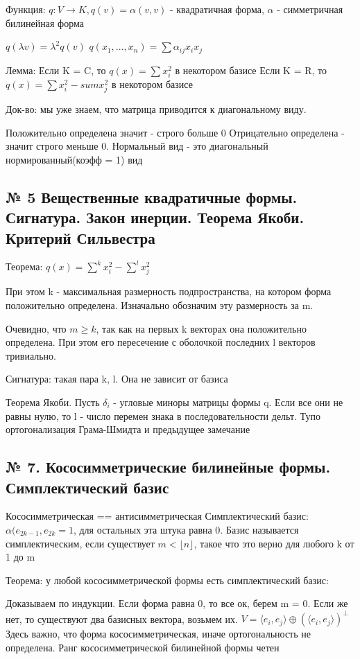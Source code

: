 \documentclass{article}
\begin{document}
Функция: $q : V \rightarrow K, q(v) = \alpha(v, v)$ - квадратичная форма, $\alpha$ - симметричная билинейная форма

$q(\lambda v) = \lambda^2q(v)$
$q(x_1, ..., x_n) = \sum{\alpha_{ij}x_ix_j}$

Лемма:
Если K = C, то $q(x) = \sum{x_i^2}$ в некотором базисе
Если K = R, то $q(x) = \sum{x_i^2} - sum{x_j^2}$ в некотором базисе

Док-во: мы уже знаем, что матрица приводится к диагональному виду.

Положительно определена значит - строго больше 0
Отрицательно определена - значит строго меньше 0.
Нормальный вид - это диагональный нормированный(коэфф = 1) вид


\subsection{\tiny № 5 Вещественные квадратичные формы. Сигнатура. Закон инерции. Теорема Якоби. Критерий Сильвестра}

Теорема:
$q(x) = \sum\limits^k{x_i^2} - \sum\limits^l{x_j^2}$

При этом k - максимальная размерность подпространства, на котором форма положительно определена. 
Изначально обозначим эту размерность за m. 

Очевидно, что $m \geq k$, так как на первых k векторах она положительно определена. При этом его пересечение с оболочкой последних l векторов тривиально.

Сигнатура: такая пара k, l. Она не зависит от базиса

Теорема Якоби.
Пусть $\delta_i$ - угловые миноры матрицы формы q.
Если все они не равны нулю, то l - число перемен знака в последовательности дельт.
Тупо ортогонализация Грама-Шмидта и предыдущее замечание

\subsection{\tiny № 7. Кососимметрические билинейные формы. Симплектический базис}

Кососимметрическая == антисимметрическая
Симплектический базис: $\alpha(e_{2k - 1}, e_{2k} = 1$,  для остальных эта штука равна 0. Базис называется симплектическим, если существует $m < \lfloor n \rfloor $, такое что это верно для любого k от 1 до m

Теорема: у любой кососимметрической формы есть симплектический базис:

Доказываем по индукции. Если форма равна 0, то все ок, берем m = 0.
Если же нет, то существуют два базисных вектора, возьмем их.
$V = \langle e_i, e_j \rangle \oplus (\langle e_i, e_j \rangle)^\perp$
Здесь важно, что форма кососимметрическая, иначе ортогональность не определена.
Ранг кососимметрической билинейной формы четен
\end{document}
